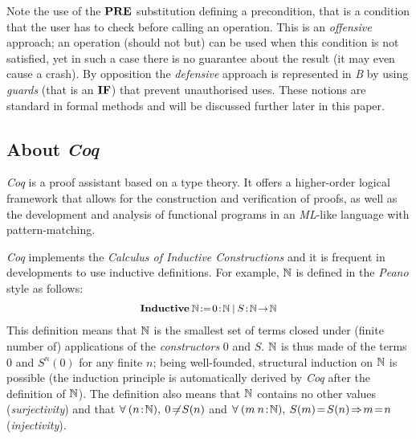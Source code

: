 \documentclass[conference]{IEEEtran}
\begin{document}
Note the use of the {\small$\mathbf{PRE}$} substitution defining a precondition, that is a
condition that the user has to check before calling an operation. This is an \emph{offensive}
approach; an operation (should not but) can be used when this condition is not satisfied, yet
in such a case there is no guarantee about the result (it may even cause a crash). By
opposition the \emph{defensive} approach is represented in \emph{B} by using \emph{guards}
(that is an {\small$\mathbf{IF}$}) that prevent unauthorised uses. These notions are standard in
formal methods and will be discussed further later in this paper.

\subsection{About \emph{Coq}}\label{Coq}

\emph{Coq} is a proof assistant based on a type theory. It offers a higher-order logical
framework that allows for the construction and verification of proofs, as well as the
development and analysis of functional programs in an \emph{ML}-like language with
pattern-matching.

\emph{Coq} implements the \emph{Calculus of Inductive Constructions}
\cite{DBLP:conf/colog/CoquandP88} and it is frequent in developments to use inductive
definitions. For example, $\mathbb{N}$ is defined in the \emph{Peano} style as follows:
\[\small\begin{array}{l}
\Cmd{Inductive}\:\NAT\!:=\!0\!:\!\NAT\:|\:S\!:\!\NAT\!\to\!\NAT
\end{array}\]
This definition means that {\small$\mathbb{N}$}  is the smallest set of terms closed under (finite
number of) applications of the \emph{constructors} {\small$0$} and {\small$S$}. {\small$\mathbb{N}$}
is thus made of the terms {\small$0$} and {\small$S^n(0)$} for any finite {\small$n$}; being
well-founded, structural induction on {\small$\mathbb{N}$} is possible (the induction principle is
automatically derived by \emph{Coq} after the definition of {\small$\mathbb{N}$}). The definition
also means that {\small$\mathbb{N}$} contains no other values (\emph{surjectivity}) and that
{\small$\forall\:(n\!:\!\mathbb{N}),\:0\not\!=\!S(n)$} and
{\small$\forall\:(m\:n\!:\!\NAT),\:S(m)\!=\!S(n)\!\Rightarrow\!m\!=\!n$} (\emph{injectivity}).
\end{document}
